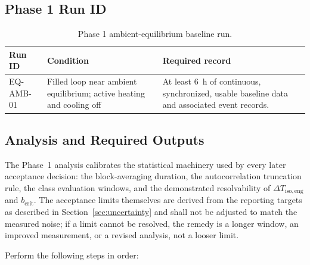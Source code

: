 \documentclass[11pt]{article}
\begin{document}
\subsection{Phase 1 Run ID}

\begin{table}[htbp]
    \centering
    \caption{Phase 1 ambient-equilibrium baseline run.}
    \label{tab:phase1_runs}
    \begin{tabularx}{\textwidth}{
        @{}
        >{\raggedright\arraybackslash}p{1.20in}
        >{\raggedright\arraybackslash}p{1.85in}
        >{\raggedright\arraybackslash}X
        @{}
    }
        \toprule
        \textbf{Run ID} &
        \textbf{Condition} &
        \textbf{Required record} \\
        \midrule

        EQ-AMB-01 &
        Filled loop near ambient equilibrium; active heating and cooling off &
        At least \SI{6}{h} of continuous, synchronized, usable baseline data and associated event records. \\

        \bottomrule
    \end{tabularx}
\end{table}

\subsection{Analysis and Required Outputs}

The Phase~1 analysis calibrates the statistical machinery used by every later acceptance decision: the block-averaging duration, the autocorrelation truncation rule, the class evaluation windows, and the demonstrated resolvability of $\Delta T_{\mathrm{iso,eng}}$ and $b_{\mathrm{crit}}$. The acceptance limits themselves are derived from the reporting targets as described in Section~\ref{sec:uncertainty} and shall not be adjusted to match the measured noise; if a limit cannot be resolved, the remedy is a longer window, an improved measurement, or a revised analysis, not a looser limit.

Perform the following steps in order:
\end{document}
